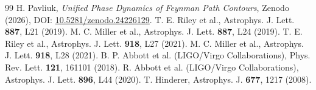 \documentclass[11pt,a4paper]{article}
\begin{document}
\begin{thebibliography}{99}
 H. Pavliuk, \textit{Unified Phase Dynamics of Feynman Path Contours}, Zenodo (2026), DOI: \href{https://doi.org/10.5281/zenodo.24226129}{10.5281/zenodo.24226129}.
 T. E. Riley et al., Astrophys. J. Lett. \textbf{887}, L21 (2019).
 M. C. Miller et al., Astrophys. J. Lett. \textbf{887}, L24 (2019).
 T. E. Riley et al., Astrophys. J. Lett. \textbf{918}, L27 (2021).
 M. C. Miller et al., Astrophys. J. Lett. \textbf{918}, L28 (2021).
 B. P. Abbott et al. (LIGO/Virgo Collaborations), Phys. Rev. Lett. \textbf{121}, 161101 (2018).
 R. Abbott et al. (LIGO/Virgo Collaborations), Astrophys. J. Lett. \textbf{896}, L44 (2020).
 T. Hinderer, Astrophys. J. \textbf{677}, 1217 (2008).
\end{thebibliography}
\end{document}

